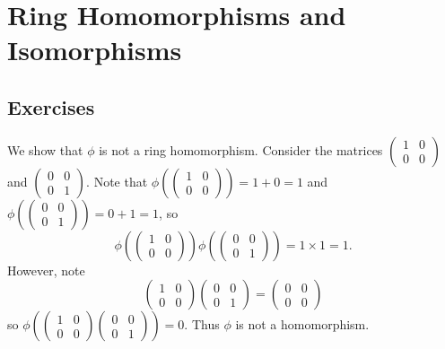 \section{Ring Homomorphisms and Isomorphisms}
\subsection*{Exercises}
\begin{questions}
    \item We show that $\phi$ is not a ring homomorphism. Consider the matrices $\begin{pmatrix}1&0\\0&0\end{pmatrix}$ and $\begin{pmatrix}0&0\\0&1\end{pmatrix}$. Note that $\phi\left(\begin{pmatrix}1&0\\0&0\end{pmatrix}\right) = 1 + 0 = 1$ and $\phi\left(\begin{pmatrix}0&0\\0&1\end{pmatrix}\right) = 0 + 1 = 1$, so
    \[
        \phi\left(\begin{pmatrix}1&0\\0&0\end{pmatrix}\right)\phi\left(\begin{pmatrix}0&0\\0&1\end{pmatrix}\right) = 1 \times 1 = 1.
    \]
    However, note
    \[
        \begin{pmatrix}1&0\\0&0\end{pmatrix}\begin{pmatrix}0&0\\0&1\end{pmatrix} = \begin{pmatrix}0&0\\0&0\end{pmatrix}
    \]
    so $\phi\left(\begin{pmatrix}1&0\\0&0\end{pmatrix}\begin{pmatrix}0&0\\0&1\end{pmatrix}\right) = 0$. Thus $\phi$ is not a homomorphism.


\end{questions}
